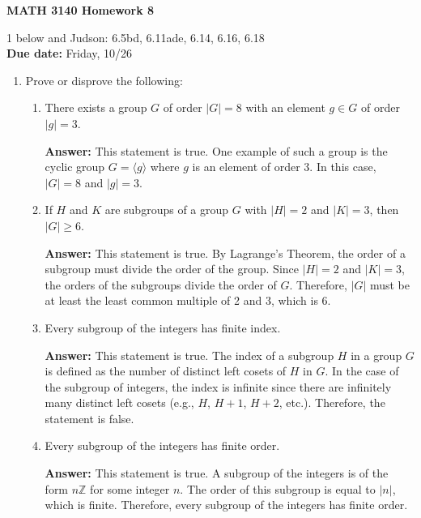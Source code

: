 \documentclass[12pt,reqno]{amsart}
\newcommand{\subject}{MATH\xspace}
\newcommand{\coursenumber}{3140\xspace}
\newcommand{\probskip}{\vskip1cm}
\begin{document}
\thispagestyle{empty}

\noindent \textbf{\subject \coursenumber Homework 8}

\medskip

 1 below and Judson: 6.5bd, 6.11ade, 6.14, 6.16, 6.18\\
{\bf Due date:} Friday, 10/26

\bigskip

\begin{enumerate}[{\bf 1.}]

\item
Prove or disprove the following: 
\begin{enumerate}
\item 
There exists a group $G$ of order $|G| = 8$ with an element
$g \in G$ of order $|g|=3$.

\textbf{Answer:} This statement is true. One example of such a group is the cyclic group $G = \langle g \rangle$ where $g$ is an element of order 3. In this case, $|G| = 8$ and $|g| = 3$.

\item
If $H$ and $K$ are subgroups of a group $G$ with $|H|=2$ and $|K|=3$, 
  then $|G|\geq 6$.

\textbf{Answer:} This statement is true. By Lagrange's Theorem, the order of a subgroup must divide the order of the group. Since $|H| = 2$ and $|K| = 3$, the orders of the subgroups divide the order of $G$. Therefore, $|G|$ must be at least the least common multiple of 2 and 3, which is 6.

\item
Every subgroup of the integers has finite index.

\textbf{Answer:} This statement is true. The index of a subgroup $H$ in a group $G$ is defined as the number of distinct left cosets of $H$ in $G$. In the case of the subgroup of integers, the index is infinite since there are infinitely many distinct left cosets (e.g., $H$, $H+1$, $H+2$, etc.). Therefore, the statement is false.

\item 
Every subgroup of the integers has finite order.

\textbf{Answer:} This statement is true. A subgroup of the integers is of the form $n\mathbb{Z}$ for some integer $n$. The order of this subgroup is equal to $|n|$, which is finite. Therefore, every subgroup of the integers has finite order.

\end{enumerate}
\probskip


\end{enumerate}
\end{document}
